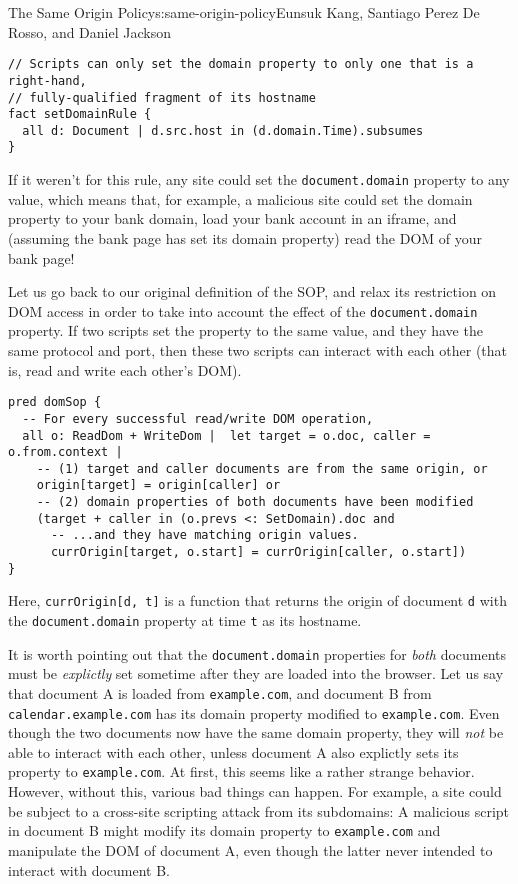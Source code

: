 \begin{aosachapter}{The Same Origin Policy}{s:same-origin-policy}{Eunsuk Kang, Santiago Perez De Rosso, and Daniel Jackson}
\begin{verbatim}
// Scripts can only set the domain property to only one that is a right-hand,
// fully-qualified fragment of its hostname
fact setDomainRule {
  all d: Document | d.src.host in (d.domain.Time).subsumes
}
\end{verbatim}

If it weren't for this rule, any site could set the
\texttt{document.domain} property to any value, which means that, for
example, a malicious site could set the domain property to your bank
domain, load your bank account in an iframe, and (assuming the bank page
has set its domain property) read the DOM of your bank page!

Let us go back to our original definition of the SOP, and relax its
restriction on DOM access in order to take into account the effect of
the \texttt{document.domain} property. If two scripts set the property
to the same value, and they have the same protocol and port, then these
two scripts can interact with each other (that is, read and write each
other's DOM).

\begin{verbatim}
pred domSop {
  -- For every successful read/write DOM operation,
  all o: ReadDom + WriteDom |  let target = o.doc, caller = o.from.context |
    -- (1) target and caller documents are from the same origin, or
    origin[target] = origin[caller] or
    -- (2) domain properties of both documents have been modified
    (target + caller in (o.prevs <: SetDomain).doc and
      -- ...and they have matching origin values.
      currOrigin[target, o.start] = currOrigin[caller, o.start])
}
\end{verbatim}

Here, \texttt{currOrigin{[}d, t{]}} is a function that returns the
origin of document \texttt{d} with the \texttt{document.domain} property
at time \texttt{t} as its hostname.

It is worth pointing out that the \texttt{document.domain} properties
for \emph{both} documents must be \emph{explictly} set sometime after
they are loaded into the browser. Let us say that document A is loaded
from \texttt{example.com}, and document B from
\texttt{calendar.example.com} has its domain property modified to
\texttt{example.com}. Even though the two documents now have the same
domain property, they will \emph{not} be able to interact with each
other, unless document A also explictly sets its property to
\texttt{example.com}. At first, this seems like a rather strange
behavior. However, without this, various bad things can happen. For
example, a site could be subject to a cross-site scripting attack from
its subdomains: A malicious script in document B might modify its domain
property to \texttt{example.com} and manipulate the DOM of document A,
even though the latter never intended to interact with document B.


\end{aosachapter}
